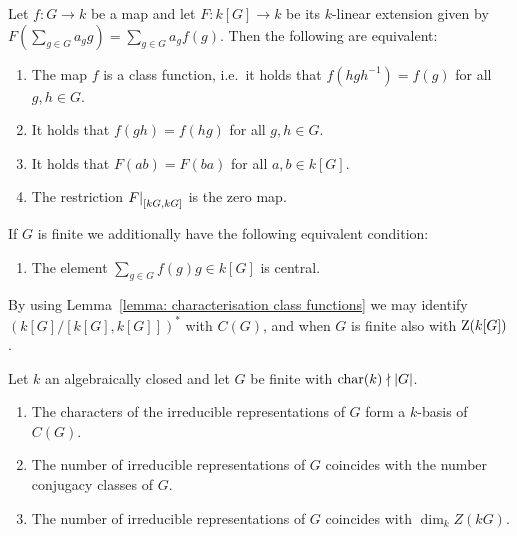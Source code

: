 \begin{lemma}
  \label{lemma: characterisation class functions}
  Let $f \colon G \to k$ be a map and let $F \colon k[G] \to k$ be its $k$-linear extension given by $F(\sum_{g \in G} a_g g) = \sum_{g \in G} a_g f(g)$.
  Then the following are equivalent:
  \begin{enumerate}
    \item \label{enum: class function}
      The map $f$ is a class function, i.e.\ it holds that $f(h g h^{-1}) = f(g)$ for all $g, h \in G$.
    \item
      It holds that $f(gh) = f(hg)$ for all $g, h \in G$.
    \item
      It holds that $F(ab) = F(ba)$ for all $a, b \in k[G]$.
    \item
      The restriction $\restrict{F}{[kG,kG]}$ is the zero map.
  \end{enumerate}
  If $G$ is finite we additionally have the following equivalent condition:
  \begin{enumerate}[resume]
    \item
      \label{enum: center of group algebra}
      The element $\sum_{g \in G} f(g) g \in k[G]$ is central.
  \end{enumerate}
\end{lemma}




\begin{fluff}
  By using Lemma~\ref{lemma: characterisation class functions} we may identify $(k[G]/[k[G], k[G]])^*$ with $C(G)$, and when $G$ is finite also with $\operatorname{Z}(k[G])$.
\end{fluff}




\begin{proposition}
  \label{proposition: conjugacy classes and irreducible representations}
  Let $k$ an algebraically closed and let $G$ be finite with $\operatorname{char}(k) \nmid |G|$.
  \begin{enumerate}
    \item
      \label{enumerate: characters are basis of class functions}
     The characters of the irreducible representations of $G$ form a $k$-basis of $C(G)$.
    \item
      \label{enumerate: number of irr rep is number of conjugacy classes}
      The number of irreducible representations of $G$ coincides with the number conjugacy classes of $G$.
    \item
      \label{enumerate: number of irr rep is dim of center}
      The number of irreducible representations of $G$ coincides with $\dim_k Z(kG)$.
  \end{enumerate}
\end{proposition}


